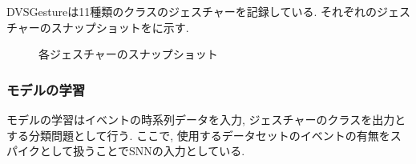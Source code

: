 DVSGestureは11種類のクラスのジェスチャーを記録している.
それぞれのジェスチャーのスナップショットをに示す.
\begin{figure}[htbp]
    \centering
    
    \caption{各ジェスチャーのスナップショット}
    \label{fig:dvs:gesture}
\end{figure}


\subsubsection{モデルの学習}
モデルの学習はイベントの時系列データを入力, ジェスチャーのクラスを出力とする分類問題として行う.
ここで, 使用するデータセットのイベントの有無をスパイクとして扱うことでSNNの入力としている.
